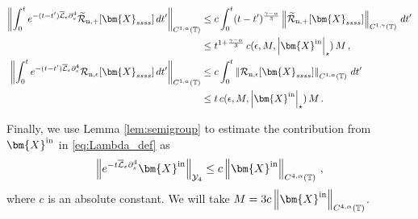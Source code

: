 \documentclass[11pt,reqno]{amsart}
\newcommand{\T}{\mathbb{T}}
\newcommand{\X}{\bm{X}}
\newcommand{\p}{\partial}
\newcommand{\abs}[1]{\left\lvert #1 \right\rvert}
\newcommand{\norm}[1]{\left\lVert #1 \right\rVert}
\newcommand{\wt}[1]{\widetilde{#1}}
\newcommand{\mc}[1]{\mathcal{#1}}
\theoremstyle{definition}
\begin{document}
\begin{equation}
\begin{aligned}
  \norm{\int_0^t e^{-(t-t')\overline{\mc{L}}_\epsilon\p_s^4}\wt{\mc{R}}_{\rm n,+}[\X_{ssss}]\,dt'}_{C^{1,\alpha}(\T)}
  &\le c\int_0^t (t-t')^{\frac{\gamma-\alpha}{3}}\norm{\wt{\mc{R}}_{\rm n,+}[\X_{ssss}]}_{C^{1,\gamma}(\T)}\,dt' \\
  &\le t^{1+\frac{\gamma-\alpha}{3}}\,c(\epsilon,M,\abs{\X^{\rm in}}_\star)\,M\,,\\
  \norm{\int_0^t e^{-(t-t')\overline{\mc{L}}_\epsilon\p_s^4}\mc{R}_{\rm n,\epsilon}[\X_{ssss}]\,dt'}_{C^{1,\alpha}(\T)}
  &\le c\int_0^t \norm{\mc{R}_{\rm n,\epsilon}[\X_{ssss}]}_{C^{1,\alpha}(\T)}\,dt' \\
  &\le t\,c(\epsilon,M,\abs{\X^{\rm in}}_\star)\,M\,.
\end{aligned}
\end{equation}


Finally, we use Lemma \ref{lem:semigroup} to estimate the contribution from $\X^{\rm in}$ in \eqref{eq:Lambda_def} as
\begin{equation}\label{eq:c_def}
  \norm{e^{-t\overline{\mc{L}}_\epsilon\p_s^4}\X^{\rm in}}_{\mc{Y}_4} \le c\norm{\X^{\rm in}}_{C^{4,\alpha}(\T)}\,, 
\end{equation}
where $c$ is an absolute constant. We will take $M=3c\norm{\X^{\rm in}}_{C^{4,\alpha}(\T)}$. 
\end{document}
